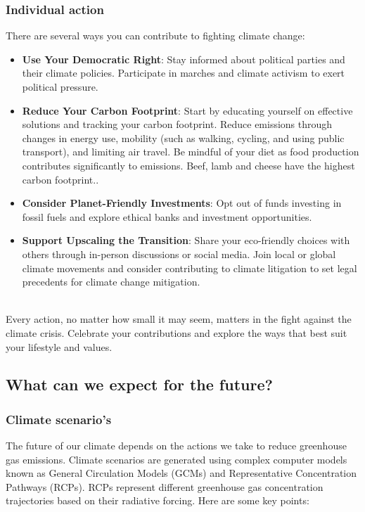 \documentclass[../summary.tex]{subfiles}
\begin{document}
\subsubsection{Individual action}

There are several ways you can contribute to fighting climate change:

\begin{itemize}
	\item \textbf{Use Your Democratic Right}: Stay informed about political parties and their climate policies. Participate in marches and climate activism to exert political pressure.
	\item \textbf{Reduce Your Carbon Footprint}: Start by educating yourself on effective solutions and tracking your carbon footprint. Reduce emissions through changes in energy use, mobility (such as walking, cycling, and using public transport), and limiting air travel. Be mindful of your diet as food production contributes significantly to emissions. Beef, lamb and cheese have the highest carbon footprint..
	\item \textbf{Consider Planet-Friendly Investments}: Opt out of funds investing in fossil fuels and explore ethical banks and investment opportunities.
	\item \textbf{Support Upscaling the Transition}: Share your eco-friendly choices with others through in-person discussions or social media. Join local or global climate movements and consider contributing to climate litigation to set legal precedents for climate change mitigation.
\end{itemize}
\ \\
Every action, no matter how small it may seem, matters in the fight against the climate crisis. Celebrate your contributions and explore the ways that best suit your lifestyle and values.
\newpage

\subsection{What can we expect for the future?}
\subsubsection{Climate scenario's}

The future of our climate depends on the actions we take to reduce greenhouse gas emissions. Climate scenarios are generated using complex computer models known as General Circulation Models (GCMs) and Representative Concentration Pathways (RCPs). RCPs represent different greenhouse gas concentration trajectories based on their radiative forcing. Here are some key points:
\end{document}
